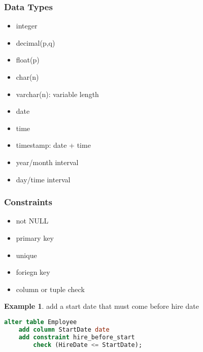 \documentclass[]{article}
\theoremstyle{definition}
\newtheorem{ex}{Example}[section]
\begin{document}
			\subsubsection{Data Types}
				\begin{multicols}{2}
					\begin{itemize}
						\item integer
						\item decimal(p,q)
						\item float(p)
						\item char(n)
						\item varchar(n): variable length
						\item date
						\item time
						\item timestamp: date + time
						\item year/month interval
						\item day/time interval
					\end{itemize}
				\end{multicols}
			\subsubsection{Constraints}
				\begin{itemize}
					\item not NULL
					\item primary key
					\item unique
					\item foriegn key
					\item column or tuple check
				\end{itemize}
				\begin{ex}
					add a start date that must come before hire date
					\begin{lstlisting}[language=SQL]
alter table Employee
	add column StartDate date
	add constraint hire_before_start
		check (HireDate <= StartDate);
					\end{lstlisting}
				\end{ex}
\end{document}
